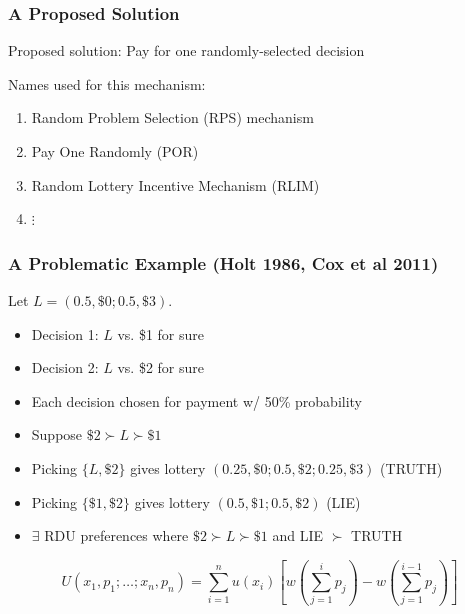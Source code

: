 
%
%
%
%
%
%



\begin{frame}
  \frametitle{A Proposed Solution}

  Proposed solution: Pay for one randomly-selected decision

  \bigskip

  Names used for this mechanism:
  \begin{enumerate}
      \item Random Problem Selection (RPS) mechanism
      \item Pay One Randomly (POR)
      \item Random Lottery Incentive Mechanism (RLIM)
      \item $\vdots$
  \end{enumerate}

\end{frame}



\begin{frame}
  \frametitle{A Problematic Example (Holt 1986, Cox et al 2011)}
  Let $L=(0.5,\$0;0.5,\$3)$.
  \begin{itemize}
    \item Decision 1: $L$ vs. \$1 for sure
    \item Decision 2: $L$ vs. \$2 for sure
    \item Each decision chosen for payment w/ 50\% probability
  \end{itemize}

  \bigskip

  \begin{itemize}
    \item Suppose $\$2\succ L \succ \$1$
    \item Picking $\{L,\$2\}$ gives lottery $(0.25,\$0;0.5,\$2;0.25,\$3)$ (TRUTH)
    \item Picking $\{\$1,\$2\}$ gives lottery $(0.5,\$1;0.5,\$2)$ (LIE)
    \item $\exists$ RDU preferences where $\$2\succ L \succ \$1$ and LIE $\succ$ TRUTH
  \end{itemize}
  $$
        U(x_1,p_1;\ldots;x_n,p_n) = \sum_{i=1}^n u(x_i) \left[ w(\sum_{j=1}^i p_j) - w(\sum_{j=1}^{i-1} p_j)\right]
  $$

\end{frame}

